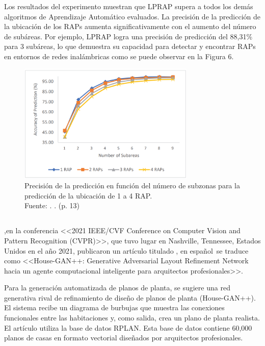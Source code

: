 Los resultados del experimento muestran que LPRAP supera a todos los demás algoritmos de Aprendizaje Automático evaluados. La precisión de la predicción de la ubicación de los RAPs aumenta significativamente con el aumento del número de subáreas. Por ejemplo, LPRAP logra una precisión de predicción del 88,31\% para 3 subáreas, lo que demuestra su capacidad para detectar y encontrar RAPs en entornos de redes inalámbricas como se puede observar en la Figura 6.

\begin{figure}[!ht]
	\begin{center}
		\includegraphics[width=0.75\textwidth]{2/figures/ketkha2022.png}
		\caption[Precisión de la predicción en función del número de subzonas para la predicción de la ubicación de 1 a 4 RAP.]{Precisión de la predicción en función del número de subzonas para la predicción de la ubicación de 1 a 4 RAP.\\
		Fuente: \cite{pr_ketkhaw2019deepl}. . (p. 13)}
		\label{2:fig114}
	\end{center}
\end{figure}

\subsection{}
\cite{pr_nauata2021housegan} ,en la conferencia <<2021 IEEE/CVF Conference on Computer Vision and Pattern Recognition (CVPR)>>, que tuvo lugar en Nashville, Tennessee, Estados Unidos en el año 2021, publicaron un artículo titulado , en español se traduce como <<House-GAN++: Generative Adversarial Layout Refinement Network hacia un agente computacional inteligente para arquitectos profesionales>>.

Para la generaci\'on automatizada de planos de planta, se sugiere una red generativa rival de refinamiento de dise\~no de planos de planta (House-GAN++). El sistema recibe un diagrama de burbujas que muestra las conexiones funcionales entre las habitaciones y, como salida, crea un plano de planta realista. El art\'iculo utiliza la base de datos RPLAN. Esta base de datos contiene 60,000 planos de casas en formato vectorial dise\~nados por arquitectos profesionales.

